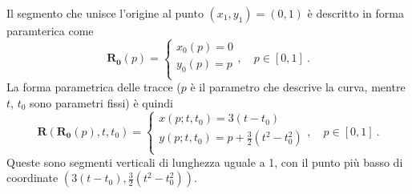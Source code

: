 \begin{itemize}
Il segmento che unisce l'origine al punto $(x_1,y_1)=(0,1)$ è descritto in forma paramterica come
\begin{equation}
\bm{R_0}(p) = \begin{cases}
 x_0(p) = 0  \\
 y_0(p) = p  \\
\end{cases}  , \quad p \in [0,1] \ .
\end{equation}
La forma parametrica delle tracce ($p$ è il parametro che descrive la curva, mentre $t$, $t_0$ sono parametri fissi) è quindi
\begin{equation}
\bm{R}(\bm{R_0}(p),t,t_0) = 
 \begin{cases}
  x(p;t,t_0) = 3(t-t_0) \\
  y(p;t,t_0) = p +\frac{3}{2} (t^2 -t_0^2) \\
 \end{cases}  , \quad p \in [0,1] \ .
\end{equation}
Queste sono segmenti verticali di lunghezza uguale a 1, con il punto più basso di coordinate $\left(3(t-t_0),\frac{3}{2}(t^2-t_0^2)\right)$.




\end{itemize}
